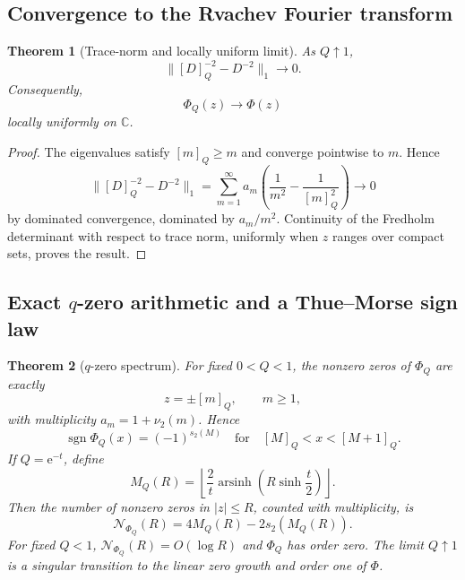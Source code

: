 \documentclass[11pt,oneside]{article}
\numberwithin{equation}{section}
\theoremstyle{plain}
\newtheorem{theorem}{Theorem}[section]
\theoremstyle{definition}
\theoremstyle{remark}
\newcommand{\arsinh}{\operatorname{arsinh}}
\newcommand{\sgn}{\operatorname{sgn}}
\newcommand{\C}{\mathbb C}
\newcommand{\e}{\mathrm e}
\begin{document}
\subsection{Convergence to the Rvachev Fourier transform}

\begin{theorem}[Trace-norm and locally uniform limit]\label{thm:PhiQ-limit}
As $Q\uparrow1$,
\begin{equation}\label{eq:trace-norm-limit}
 \bigl\|[D]_Q^{-2}-D^{-2}\bigr\|_1\longrightarrow0.
\end{equation}
Consequently,
\begin{equation}\label{eq:PhiQ-limit}
 \boxed{\ \Phi_Q(z)\longrightarrow\Phi(z)\ }
\end{equation}
locally uniformly on $\C$.
\end{theorem}

\begin{proof}
The eigenvalues satisfy $[m]_Q\ge m$ and converge pointwise to $m$.  Hence
\[
 \bigl\|[D]_Q^{-2}-D^{-2}\bigr\|_1
 =\sum_{m=1}^{\infty}a_m
 \left(\frac1{m^2}-\frac1{[m]_Q^2}\right)
 \longrightarrow0
\]
by dominated convergence, dominated by $a_m/m^2$.  Continuity of the Fredholm determinant with respect to trace norm, uniformly when $z$ ranges over compact sets, proves the result.
\end{proof}

\subsection{Exact $q$-zero arithmetic and a Thue--Morse sign law}

\begin{theorem}[$q$-zero spectrum]\label{thm:q-zeros}
For fixed $0<Q<1$, the nonzero zeros of $\Phi_Q$ are exactly
\begin{equation}\label{eq:q-zero-set}
 z=\pm[m]_Q,\qquad m\ge1,
\end{equation}
with multiplicity $a_m=1+\nu_2(m)$.  Hence
\begin{equation}\label{eq:q-sign}
 \boxed{\ \sgn\Phi_Q(x)=(-1)^{s_2(M)}
 \quad\text{for}\quad [M]_Q<x<[M+1]_Q.\ }
\end{equation}
If $Q=\e^{-t}$, define
\begin{equation}\label{eq:MQ}
 M_Q(R)=\left\lfloor
 \frac2t\arsinh\!\left(R\sinh\frac t2\right)
 \right\rfloor.
\end{equation}
Then the number of nonzero zeros in $|z|\le R$, counted with multiplicity, is
\begin{equation}\label{eq:q-zero-count}
 \boxed{\ \mathcal N_{\Phi_Q}(R)
 =4M_Q(R)-2s_2(M_Q(R)).\ }
\end{equation}
For fixed $Q<1$, $\mathcal N_{\Phi_Q}(R)=O(\log R)$ and $\Phi_Q$ has order zero.  The limit $Q\uparrow1$ is a singular transition to the linear zero growth and order one of $\Phi$.
\end{theorem}
\end{document}
